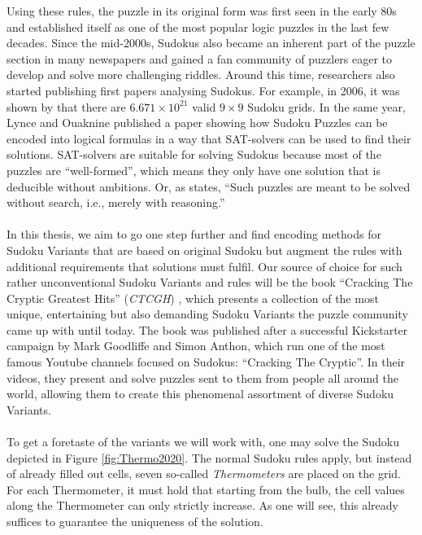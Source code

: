 Using these rules, the puzzle in its original form was first seen in the early 80s and established itself as one of the most popular logic puzzles in the last few decades. Since the mid-2000s, Sudokus also became an inherent part of the puzzle section in many newspapers and gained a fan community of puzzlers eager to develop and solve more challenging riddles. Around this time, researchers also started publishing first papers analysing Sudokus. For example, in 2006, it was shown by \cite{Felgenhauer2006MathematicsOS} that there are $6.671\times 10^{21}$ valid $9\times 9$ Sudoku grids. In the same year, Lynce and Ouaknine published a paper \cite{Lynce2006SudokuAsASATProblem} showing how Sudoku Puzzles can be encoded into logical formulas in a way that SAT-solvers can be used to find their solutions. SAT-solvers are suitable for solving Sudokus because most of the puzzles are “well-formed”, which means they only have one solution that is deducible without ambitions. Or, as \cite{Lynce2006SudokuAsASATProblem} states, ``Such puzzles are meant to be solved without search, i.e., merely with reasoning.''\\
\\
In this thesis, we aim to go one step further and find encoding methods for Sudoku Variants that are based on original Sudoku but augment the rules with additional requirements that solutions must fulfil. Our source of choice for such rather unconventional Sudoku Variants and rules will be the book ``Cracking The Cryptic Greatest Hits'' (\emph{CTCGH}) \cite{CrackingTheCryptic2021}, which presents a collection of the most unique, entertaining but also demanding Sudoku Variants the puzzle community came up with until today. The book was published after a successful Kickstarter campaign by Mark Goodliffe and Simon Anthon, which run one of the most famous Youtube channels focused on Sudokus: ``Cracking The Cryptic''\cite{ChannelCrackingTheCryptic}. In their videos, they present and solve puzzles sent to them from people all around the world, allowing them to create this phenomenal assortment of diverse Sudoku Variants.\\
\\
To get a foretaste of the variants we will work with, one may solve the Sudoku depicted in Figure \ref{fig:Thermo2020}. The normal Sudoku rules apply, but instead of already filled out cells, seven so-called \emph{Thermometers} are placed on the grid. For each Thermometer, it must hold that starting from the bulb, the cell values along the Thermometer can only strictly increase. As one will see, this already suffices to guarantee the uniqueness of the solution.\\
